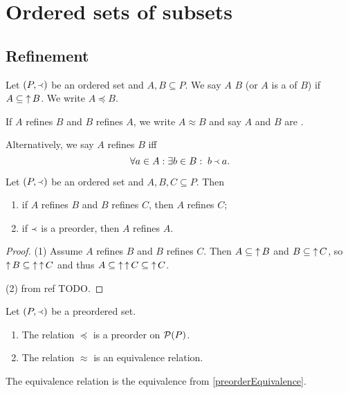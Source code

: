\section{Ordered sets of subsets}
\subsection{Refinement}
\begin{definition}
Let $\sSet{P,\Yleft}$ be an ordered set and $A,B \subseteq P$. We say $A$  $B$ (or $A$ is a  of $B$) if $A\subseteq \operatorname{\uparrow} B$. We write $A \preceq B$.

If $A$ refines $B$ and $B$ refines $A$, we write $A \approx B$ and say $A$ and $B$ are .
\end{definition}

Alternatively, we say $A$ refines $B$ iff
\[ \forall a\in A: \exists b\in B: \; b \Yleft a. \]

\begin{lemma}
Let $\sSet{P,\Yleft}$ be an ordered set and $A,B,C \subseteq P$. Then
\begin{enumerate}
\item if $A$ refines $B$ and $B$ refines $C$, then $A$ refines $C$;
\item if $\Yleft$ is a preorder, then $A$ refines $A$.
\end{enumerate}
\end{lemma}
\begin{proof}
(1) Assume $A$ refines $B$ and $B$ refines $C$. Then $A \subseteq \operatorname{\uparrow} B$ and $B\subseteq \operatorname{\uparrow} C$, so $\operatorname{\uparrow} B \subseteq \operatorname{\uparrow}\operatorname{\uparrow} C$ and thus $A \subseteq \operatorname{\uparrow}\operatorname{\uparrow} C \subseteq \operatorname{\uparrow} C$.

(2) from  ref TODO.
\end{proof}
\begin{corollary}
Let $\sSet{P,\Yleft}$ be a preordered set.
\begin{enumerate}
\item The relation $\preceq$ is a preorder on $\operatorname{\mathcal{P}}(P)$.
\item The relation $\approx$ is an equivalence relation.
\end{enumerate}
\end{corollary}
The equivalence relation is the equivalence from \ref{preorderEquivalence}.

